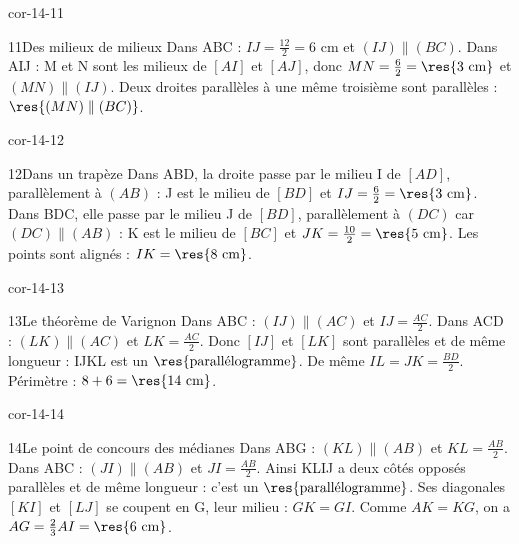 \begin{blocLivre}{cor-14-11}\begin{corrige}{11}{Des milieux de milieux}
Dans ABC : $IJ=\frac{12}2=6$ cm et $(IJ)\parallel(BC)$. Dans AIJ : M et N sont les milieux de $[AI]$ et $[AJ]$, donc $MN=\frac62=\res{3\ \mathrm{cm}}$ et $(MN)\parallel(IJ)$. Deux droites parallèles à une même troisième sont parallèles : $\res{(MN)\parallel(BC)}$.
\label{fig-cor-14-11}
\end{corrige}\end{blocLivre}
\begin{blocLivre}{cor-14-12}\begin{corrige}{12}{Dans un trapèze}
Dans ABD, la droite passe par le milieu I de $[AD]$, parallèlement à $(AB)$ : J est le milieu de $[BD]$ et $IJ=\frac62=\res{3\ \mathrm{cm}}$. Dans BDC, elle passe par le milieu J de $[BD]$, parallèlement à $(DC)$ car $(DC)\parallel(AB)$ : K est le milieu de $[BC]$ et $JK=\frac{10}2=\res{5\ \mathrm{cm}}$. Les points sont alignés : $IK=\res{8\ \mathrm{cm}}$.
\label{fig-cor-14-12}
\end{corrige}\end{blocLivre}
\begin{blocLivre}{cor-14-13}\begin{corrige}{13}{Le théorème de Varignon}
Dans ABC : $(IJ)\parallel(AC)$ et $IJ=\frac{AC}2$. Dans ACD : $(LK)\parallel(AC)$ et $LK=\frac{AC}2$. Donc $[IJ]$ et $[LK]$ sont parallèles et de même longueur : IJKL est un $\res{\text{parallélogramme}}$. De même $IL=JK=\frac{BD}2$. Périmètre : $8+6=\res{14\ \mathrm{cm}}$.
\label{fig-cor-14-13}
\end{corrige}\end{blocLivre}
\begin{blocLivre}{cor-14-14}\begin{corrige}{14}{Le point de concours des médianes}
Dans ABG : $(KL)\parallel(AB)$ et $KL=\frac{AB}2$. Dans ABC : $(JI)\parallel(AB)$ et $JI=\frac{AB}2$. Ainsi KLIJ a deux côtés opposés parallèles et de même longueur : c’est un $\res{\text{parallélogramme}}$. Ses diagonales $[KI]$ et $[LJ]$ se coupent en G, leur milieu : $GK=GI$. Comme $AK=KG$, on a $AG=\frac23AI=\res{6\ \mathrm{cm}}$.
\label{fig-cor-14-14}
\end{corrige}\end{blocLivre}
